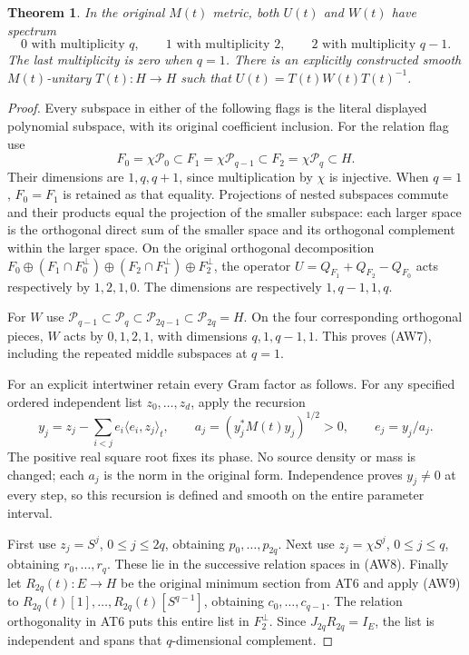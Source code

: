 \documentclass[11pt,a4paper]{article}
\newtheorem{theorem}{Theorem}[section]
\newcommand{\cP}{\mathcal P}
\begin{document}
\begin{theorem}
In the original $M(t)$ metric, both $U(t)$ and $W(t)$ have spectrum
\[
 0\text{ with multiplicity }q,\qquad
 1\text{ with multiplicity }2,\qquad
 2\text{ with multiplicity }q-1.
 \tag{AW7}
\]
The last multiplicity is zero when $q=1$. There is an explicitly
constructed smooth $M(t)$-unitary $T(t):H\to H$ such that
$U(t)=T(t)W(t)T(t)^{-1}$.
\end{theorem}
\begin{proof}
Every subspace in either of the following flags is the literal
displayed polynomial subspace, with its original coefficient inclusion.
For the relation flag use
\[
 F_0=\chi\cP_0\subset F_1=\chi\cP_{q-1}
            \subset F_2=\chi\cP_q\subset H.
 \tag{AW8}
\]
Their dimensions are $1,q,q+1$, since multiplication by $\chi$ is
injective. When $q=1$, $F_0=F_1$ is retained as that equality.
Projections of nested subspaces commute and their products equal
the projection of the smaller subspace: each larger space is the
orthogonal direct sum of the smaller space and its orthogonal
complement within the larger space. On the original orthogonal
decomposition
$F_0\oplus(F_1\cap F_0^\perp)\oplus
(F_2\cap F_1^\perp)\oplus F_2^\perp$, the operator
$U=Q_{F_1}+Q_{F_2}-Q_{F_0}$ acts respectively by $1,2,1,0$.
The dimensions are respectively $1,q-1,1,q$.

For $W$ use
$\cP_{q-1}\subset\cP_q\subset\cP_{2q-1}\subset\cP_{2q}=H$.
On the four corresponding orthogonal pieces, $W$ acts by
$0,1,2,1$, with dimensions $q,1,q-1,1$. This proves (AW7),
including the repeated middle subspaces at $q=1$.

For an explicit intertwiner retain every Gram factor as follows.
For any specified ordered independent list $z_0,\ldots,z_d$,
apply the recursion
\[
 y_j=z_j-\sum_{i<j}e_i\langle e_i,z_j\rangle_t,
 \qquad a_j=(y_j^*M(t)y_j)^{1/2}>0,
 \qquad e_j=y_j/a_j.
 \tag{AW9}
\]
The positive real square root fixes its phase. No source density or
mass is changed; each $a_j$ is the norm in the original form.
Independence proves $y_j\ne0$ at every step, so this recursion is
defined and smooth on the entire parameter interval.

First use $z_j=S^j$, $0\le j\le2q$, obtaining $p_0,\ldots,p_{2q}$.
Next use $z_j=\chi S^j$, $0\le j\le q$, obtaining
$r_0,\ldots,r_q$. These lie in the successive relation spaces
in (AW8). Finally let $R_{2q}(t):E\to H$ be the original minimum
section from AT6 and apply (AW9) to
$R_{2q}(t)[1],\ldots,R_{2q}(t)[S^{q-1}]$, obtaining
$c_0,\ldots,c_{q-1}$. The relation orthogonality in AT6 puts this
entire list in $F_2^\perp$. Since $J_{2q}R_{2q}=I_E$, the list
is independent and spans that $q$-dimensional complement.


\end{proof}
\end{document}
